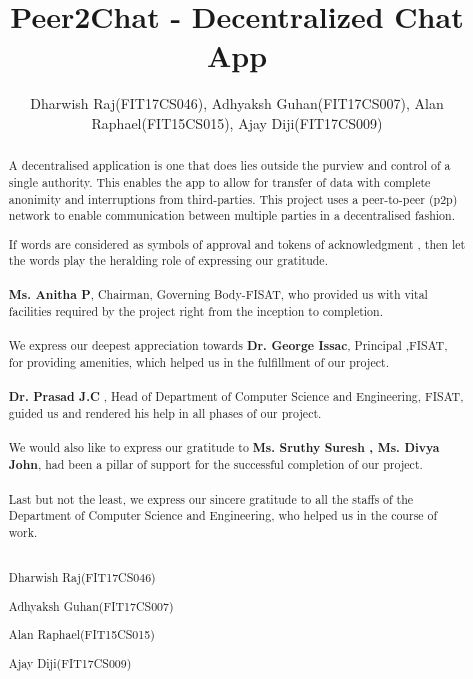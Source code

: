 \documentclass{fisatproject}
\title{Peer2Chat - Decentralized Chat App }
\author{Dharwish Raj(FIT17CS046), Adhyaksh Guhan(FIT17CS007), Alan Raphael(FIT15CS015), Ajay Diji(FIT17CS009)}
\begin{document}
\maketitle

\makecert

\newpage
\setcounter{page}{1}
\renewcommand\abstractname{ABSTRACT}
\begin{abstract}
\vspace{5cm}
A decentralised application is one that does lies outside the purview and control of a single authority. This enables the app to allow for transfer of data with complete anonimity and interruptions from third-parties. This project uses a peer-to-peer (p2p) network to enable communication between multiple parties in a decentralised fashion.
\end{abstract}


\newpage
\renewcommand\abstractname{ACKNOWLEDGMENT}
\begin{abstract}
\vspace{5cm}
If words are considered as symbols of approval and tokens of acknowledgment , then let the words play the heralding role of expressing our gratitude. \\ \\
 \textbf{Ms. Anitha P}, Chairman, Governing Body-FISAT, who provided us with vital facilities required by the project right from the inception to completion. \\ \\
 We express our deepest appreciation towards \textbf{Dr. George Issac}, Principal ,FISAT, for providing amenities, which helped us in the fulfillment of our project. \\ \\
 \textbf{Dr. Prasad J.C} , Head of Department of Computer Science and Engineering, FISAT, guided us  and rendered his help in all phases of our project. \\ \\
 We would also like to express our gratitude to \textbf{Ms. Sruthy Suresh , Ms. Divya John}, had been a pillar of support for the successful completion of our project. \\ \\
 Last but not the least, we express our sincere gratitude to all the staffs of the Department of Computer Science  and Engineering, who helped us in the course of work. \\ \\

\vspace{1cm}
\begin{flushright}
Dharwish Raj(FIT17CS046)

Adhyaksh Guhan(FIT17CS007)

Alan Raphael(FIT15CS015)

Ajay Diji(FIT17CS009)
\end{flushright}
\end{abstract}
\newpage
\end{document}
